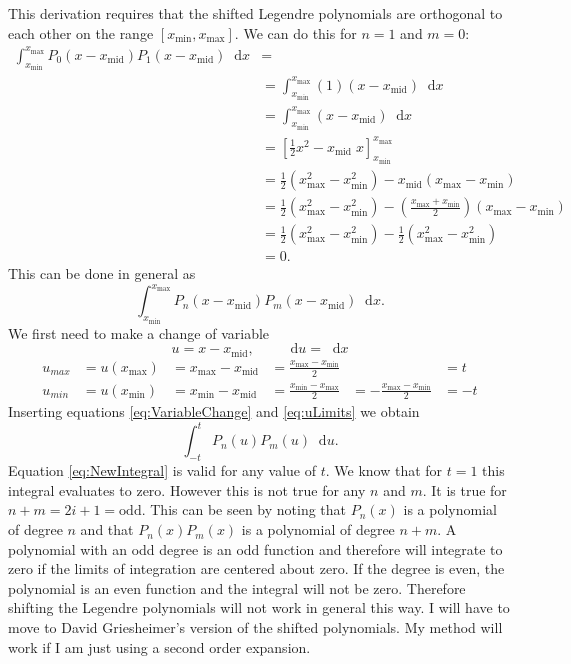\documentclass[12pt]{article}
\newcommand{\xmax}{x_{\max}}
\newcommand{\xmin}{x_{\min}}
\newcommand{\xmid}{x_{\mathrm{mid}}}
\newcommand{\xt}{x-\xmid}
\newcommand{\dd}{\mathop{}\!\mathrm{d}}
\begin{document}
This derivation requires that the shifted Legendre polynomials are orthogonal to each other on the range $[\xmin, \xmax]$.  We can do this for $n=1$ and $m=0$:
\begin{equation}
    \begin{split}
        \int_{\xmin}^{\xmax} P_0(x-\xmid)P_1(x-\xmid) \dd x &= \\
         &=\int_{\xmin}^{\xmax} (1) \left( x-\xmid \right) \dd x \\
         &=\int_{\xmin}^{\xmax} \left( x-\xmid \right) \dd x \\
         &=\left[\frac{1}{2}x^2-\xmid\; x\right]_{\xmin}^{\xmax} \\
         &=\frac{1}{2}\left(\xmax^2 - \xmin^2\right)-\xmid\left(\xmax-\xmin\right)\\
         &=\frac{1}{2}\left(\xmax^2 - \xmin^2\right)-\left(\frac{\xmax+\xmin}{2}\right)\left(\xmax-\xmin\right)\\
         &=\frac{1}{2}\left(\xmax^2 - \xmin^2\right)-\frac{1}{2}\left(\xmax^2-\xmin^2\right)\\
         &= 0.
    \end{split}
\end{equation}
This can be done in general as
\begin{equation}
    \int_{\xmin}^{\xmax}P_n(\xt)P_m(\xt) \dd x.
\end{equation}
We first need to make a change of variable
\begin{equation}
   u = \xt, \qquad  \dd u = \dd x
   \label{eq:VariableChange}
\end{equation}
\begin{subequations}
    \label{eq:uLimits}
    \begin{alignat}{4}
        u_{max} &= u(\xmax) &= \xmax - \xmid &= \frac{\xmax - \xmin}{2} & &=t \\
        u_{min} &= u(\xmin) &= \xmin - \xmid &= \frac{\xmin - \xmax}{2} &=-\frac{\xmax - \xmin}{2} &= -t
    \end{alignat}
\end{subequations}
Inserting equations \eqref{eq:VariableChange} and \eqref{eq:uLimits} we obtain
\begin{equation}
    \int_{-t}^{t}P_n(u)P_m(u) \dd u.
    \label{eq:NewIntegral}
\end{equation}
Equation \eqref{eq:NewIntegral} is valid for any value of $t$.  We know that for $t=1$ this integral evaluates to zero.  However this is not true for any $n$ and $m$.  It is true for $n+m = 2i+1 = \mathrm{odd}$.  This can be seen by noting that $P_n(x)$ is a polynomial of degree $n$ and that $P_n(x)P_m(x)$ is a polynomial of degree $n+m$.  A polynomial with an odd degree is an odd function and therefore will integrate to zero if the limits of integration are centered about zero.  If the degree is even, the polynomial is an even function and the integral will not be zero.  Therefore shifting the Legendre polynomials will not work in general this way.  I will have to move to David Griesheimer's version of the shifted polynomials.  My method will work if I am just using a second order expansion.
\end{document}
